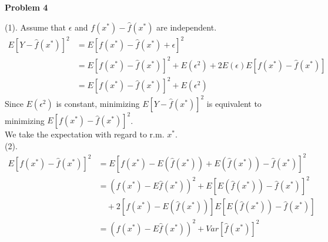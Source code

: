 \documentclass[UTF8,12pt]{article}
\newenvironment{problem}[2][Problem]
{ \begin{mdframed}[backgroundcolor=gray!20] \textbf{#1 #2}}
	{  \end{mdframed}}
\newenvironment{answer}
{}%
{}
\newenvironment{eq}
{
	\begin{equation}
		\begin{aligned}
}
{
		\end{aligned}
	\end{equation}
}
\begin{document}
\begin{problem}{4}
\end{problem}
\begin{answer}
	(1).
	Assume that $\epsilon$ and $f(x^*)-\hat{f}(x^*)$ are independent.
	\begin{eq}\nonumber
		E[Y-\hat{f}(x^*)]^2 &= E[f(x^*)-\hat{f}(x^*)+\epsilon]^2\\
		&= E[f(x^*)-\hat{f}(x^*)]^2 + E(\epsilon^2) + 2E(\epsilon)E[f(x^*)-\hat{f}(x^*)]\\
		&= E[f(x^*)-\hat{f}(x^*)]^2 + E(\epsilon^2)
	\end{eq}
	Since $E(\epsilon^2)$ is constant, minimizing $E[Y-\hat{f}(x^*)]^2$ is equivalent to
	minimizing $E[f(x^*)-\hat{f}(x^*)]^2$.\\
	We take the expectation with regard to r.m. $x^*$.\\
	(2).
	\begin{eq}\nonumber
		E[f(x^*)-\hat{f}(x^*)]^2
		&= E[f(x^*)-E(\hat{f}(x^*))+E(\hat{f}(x^*))-\hat{f}(x^*)]^2\\
		&= (f(x^*)-E\hat{f}(x^*))^2 + E[E(\hat{f}(x^*))-\hat{f}(x^*)]^2\\
		&\quad + 2[f(x^*)-E(\hat{f}(x^*))]E[E(\hat{f}(x^*))-\hat{f}(x^*)]\\
		&= (f(x^*)-E\hat{f}(x^*))^2 + Var[\hat{f}(x^*)]^2
	\end{eq}
\end{answer}
\end{document}
